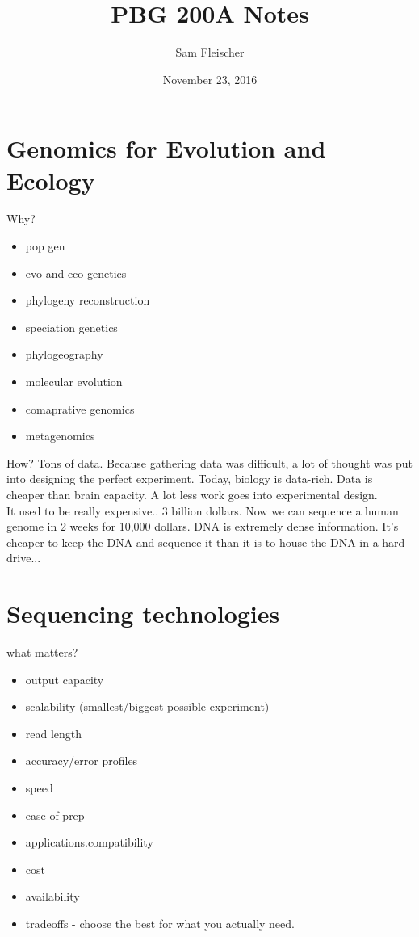 \documentclass{article}
\title{PBG 200A Notes}
\author{Sam Fleischer}
\date{November 23, 2016}
\begin{document}
    \maketitle

    \section{Genomics for Evolution and Ecology}
        Why?
        \begin{itemize}
            \item pop gen
            \item evo and eco genetics
            \item phylogeny reconstruction
            \item speciation genetics
            \item phylogeography
            \item molecular evolution
            \item comaprative genomics
            \item metagenomics
        \end{itemize}
        How?  Tons of data.  Because gathering data was difficult, a lot of thought was put into designing the perfect experiment.  Today, biology is data-rich.  Data is cheaper than brain capacity.  A lot less work goes into experimental design. \\

        It used to be really expensive.. 3 billion dollars.  Now we can sequence a human genome in 2 weeks for 10,000 dollars.  DNA is extremely dense information.  It's cheaper to keep the DNA and sequence it than it is to house the DNA in a hard drive... \\

    \section{Sequencing technologies}
        what matters?
        \begin{itemize}
            \item output capacity
            \item scalability (smallest/biggest possible experiment)
            \item read length
            \item accuracy/error profiles
            \item speed
            \item ease of prep
            \item applications.compatibility
            \item cost
            \item availability
            \item tradeoffs - choose the best for what you actually need.
        \end{itemize}
\end{document}

